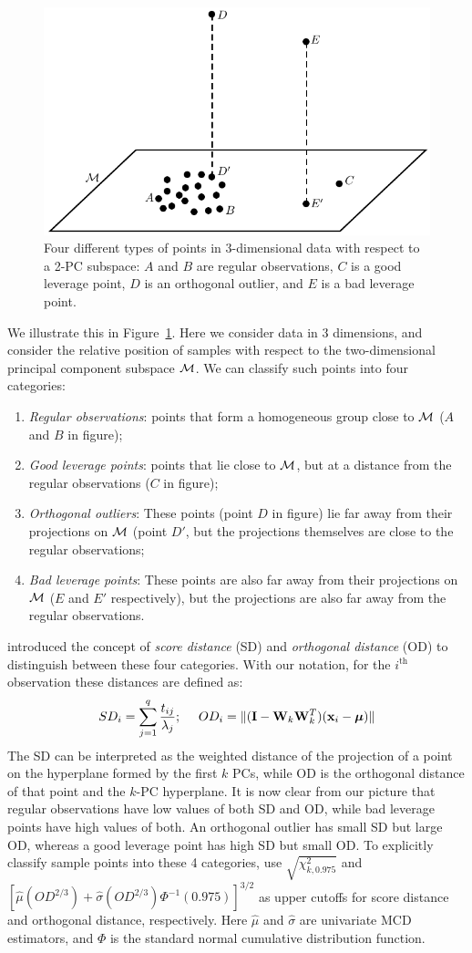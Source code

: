 \begin{figure}[t]
\centering
\includegraphics[width=.6\textwidth]{ROBPCA}
	\caption{Four different types of points in 3-dimensional data with respect to a 2-PC subspace: $A$ and $B$ are regular observations, $C$ is a good leverage point, $D$ is an orthogonal outlier, and $E$ is a bad leverage point.}
	\label{fig:figROBPCA}
\end{figure}

We illustrate this in Figure~\ref{fig:figROBPCA}. Here we consider data in 3 dimensions, and consider the relative position of samples with respect to the two-dimensional principal component subspace ${\cal{M}}$. We can classify such points into four categories:

\begin{enumerate}
\item{\it Regular observations}: points that form a homogeneous group close to ${\cal{M}}$ ($A$ and $B$ in figure);
\item{\it Good leverage points}: points that lie close to ${\cal{M}}$, but at a distance from the regular observations ($C$ in figure);
\item{\it Orthogonal outliers}: These points (point $D$ in figure) lie far away from their projections on ${\cal{M}}$ (point $D'$, but the projections themselves are close to the regular observations;
\item{\it Bad leverage points}: These points are also far away from their projections on ${\cal{M}}$ ($E$ and $E'$ respectively), but the projections are also far away from the regular observations.
\end{enumerate}

\cite{hubert05} introduced the concept of \textit{score distance} (SD) and \textit{orthogonal distance} (OD) to distinguish between these four categories. With our notation, for the $i^\text{th}$ observation these distances are defined as:
%
$$
SD_i = \sum_{j=1}^q \frac{t_{ij}}{\lambda_j};\
\quad OD_i  =\| ( {\mathbf{I}} - {\mathbf{W}}_k {\mathbf{W}}_k^T) ({\bf{x}}_i - {\boldsymbol{\mu}}) \|
$$
%
The SD can be interpreted as the weighted distance of the projection of a point on the hyperplane formed by the first $k$ PCs, while OD is the orthogonal distance of that point and the $k$-PC hyperplane. It is now clear from our picture that regular observations have low values of both SD and OD, while bad leverage points have high values of both. An orthogonal outlier has small SD but large OD, whereas a good leverage point has high SD but small OD. To explicitly classify sample points into these 4 categories, \cite{hubert05} use $\sqrt {\chi^2_{k,0.975}}$ and $[ \hat \mu (OD^{2/3}) + \hat \sigma (OD^{2/3}) \Phi^{-1} (0.975) ]^{3/2}$ as upper cutoffs for score distance and orthogonal distance, respectively. Here $\hat \mu$ and $\hat \sigma$ are univariate MCD estimators, and $\Phi$ is the standard normal cumulative distribution function.